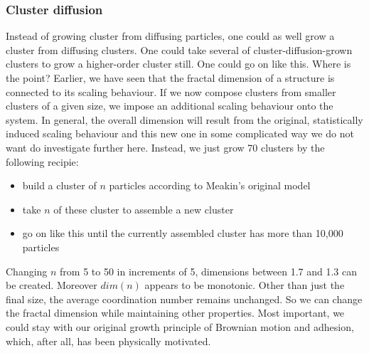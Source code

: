 \documentclass[twocolumn,10pt]{scrartcl}
\begin{document}
            \subsubsection{Cluster diffusion}
                Instead of growing cluster from diffusing particles, one could as well grow a cluster from diffusing
                clusters. One could take several of cluster-diffusion-grown clusters to grow a higher-order cluster
                still. One could go on like this. Where is the point? Earlier, we have seen that the fractal dimension
                of a structure is connected to its scaling behaviour. If we now compose clusters from smaller clusters
                of a given size, we impose an additional scaling behaviour onto the system. In general, the overall
                dimension will result from the original, statistically induced scaling behaviour and this new one in
                some complicated way we do not want do investigate further here. Instead, we just grow 70 clusters by the
                following recipie:
                \begin{itemize}
                    \item build a cluster of $n$ particles according to Meakin's original model
                    \item take $n$ of these cluster to assemble a new cluster
                    \item go on like this until the currently assembled cluster has more than 10,000 particles
                \end{itemize}
                Changing $n$ from 5 to 50 in increments of 5, dimensions between 1.7 and 1.3 can be created. Moreover
                $dim(n)$ appears to be monotonic. Other than just the final size, the average coordination number
                remains unchanged. So we can change the fractal dimension while maintaining other properties.
                Most important, we could stay with our original growth principle of Brownian motion and adhesion,
                which, after all, has been physically motivated.
\end{document}
